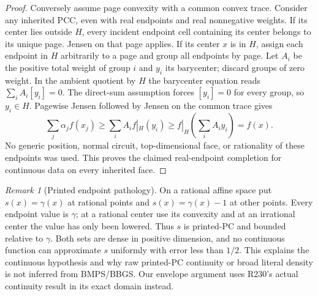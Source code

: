 \documentclass[11pt]{article}
\theoremstyle{definition}\newtheorem{definition}[theorem]{Definition}
\theoremstyle{remark}\newtheorem{remark}[theorem]{Remark}
\begin{document}
\begin{proof}
Conversely assume page convexity with a common convex trace. Consider any inherited PCC, even with real endpoints and real nonnegative weights. If its center lies outside $H$, every incident endpoint cell containing its center belongs to its unique page. Jensen on that page applies. If its center $x$ is in $H$, assign each endpoint in $H$ arbitrarily to a page and group all endpoints by page. Let $A_i$ be the positive total weight of group $i$ and $y_i$ its barycenter; discard groups of zero weight. In the ambient quotient by $H$ the barycenter equation reads
$\sum_i A_i[y_i]=0$.
The direct-sum assumption forces $[y_i]=0$ for every group, so $y_i\in H$. Pagewise Jensen followed by Jensen on the common trace gives
\[
\sum_j\alpha_jf(x_j)\geq\sum_i A_i f|_H(y_i)\geq f|_H\left(\sum_iA_i y_i\right)=f(x).
\]
No generic position, normal circuit, top-dimensional face, or rationality of these endpoints was used. This proves the claimed real-endpoint completion for continuous data on every inherited face.
\end{proof}

\begin{remark}[Printed endpoint pathology]
On a rational affine space put $s(x)=\gamma(x)$ at rational points and $s(x)=\gamma(x)-1$ at other points. Every endpoint value is $\gamma$; at a rational center use its convexity and at an irrational center the value has only been lowered. Thus $s$ is printed-PC and bounded relative to $\gamma$. Both sets are dense in positive dimension, and no continuous function can approximate $s$ uniformly with error less than $1/2$. This explains the continuous hypothesis and why raw printed-PC continuity or broad literal density is not inferred from BMPS/BBGS. Our envelope argument uses R230's actual continuity result in its exact domain instead.
\end{remark}
\end{document}
